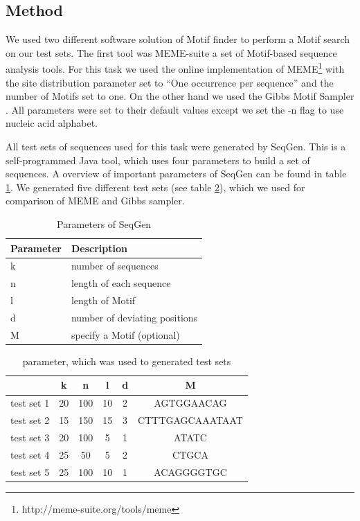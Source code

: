 \documentclass[%
   10pt,              %
   nenglish,           %
   a4paper,           %
   DIV11,             %
]{scrartcl}%
\begin{document}
\subsection*{Method}
We used two different software solution of Motif finder to perform a Motif search on our test sets. 
The first tool was MEME-suite \cite{meme} a set of Motif-based sequence analysis tools. For this task 
we used the online implementation of MEME\footnote{http://meme-suite.org/tools/meme} with the site 
distribution parameter set to ``One occurrence per sequence'' and the number of Motifs set to one. 
On the other hand we used the Gibbs Motif Sampler \cite{gibbs}. All parameters were set to their 
default values except we set the -n flag to use nucleic acid alphabet.

All test sets of sequences used for this task were generated by SeqGen. This is a self-programmed 
Java tool, which uses four parameters to build a set of sequences. A overview of important parameters 
of SeqGen can be found in table \ref{tab:params}. We generated five different test sets (see table 
\ref{tab:sets}), which we used for comparison of MEME and Gibbs sampler.

\begin{table}[ht]
 \centering
 \caption{Parameters of SeqGen}
 \begin{tabular}{|l|l|}
  \hline
  Parameter & Description \\
  \hline
  k & number of sequences \\
  n & length of each sequence \\
  l & length of Motif \\
  d & number of deviating positions \\
  M & specify a Motif (optional) \\
  \hline
 \end{tabular}
 \label{tab:params}
\end{table}

\begin{table}[ht]
 \centering
 \caption{parameter, which was used to generated test sets}
 \begin{tabular}{|c|c|c|c|c|c|}
  \hline
    & k & n & l & d & M \\
  \hline
  test set 1 & 20 & 100 & 10 & 2 & AGTGGAACAG \\
  test set 2 & 15 & 150 & 15 & 3 & CTTTGAGCAAATAAT \\
  test set 3 & 20 & 100 & 5 & 1 & ATATC \\
  test set 4 & 25 & 50 & 5 & 2 & CTGCA \\
  test set 5 & 25 & 100 & 10 & 1 & ACAGGGGTGC \\
  \hline
 \end{tabular}
 \label{tab:sets}
\end{table}
\end{document}
